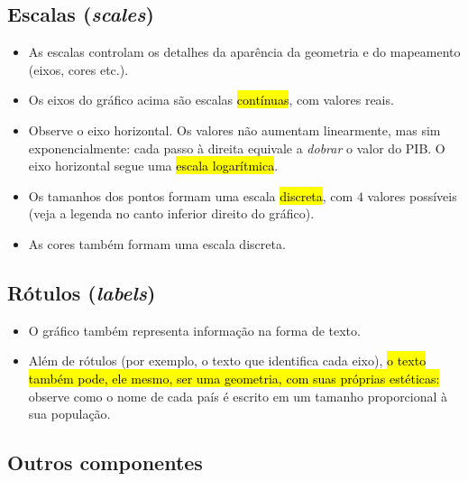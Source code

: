 \documentclass[
  11pt]{report}
\begin{document}
\hypertarget{escalas-scales}{%
\subsection{\texorpdfstring{Escalas (\emph{scales})}{Escalas (scales)}}\label{escalas-scales}}

\begin{itemize}
\item
  As escalas controlam os detalhes da aparência da geometria e do mapeamento (eixos, cores etc.).
\item
  Os eixos do gráfico acima são escalas {\hl{contínuas}}, com valores reais.
\item
  Observe o eixo horizontal. Os valores não aumentam linearmente, mas sim exponencialmente: cada passo à direita equivale a \emph{dobrar} o valor do PIB. O eixo horizontal segue uma {\hl{escala logarítmica}}.
\item
  Os tamanhos dos pontos formam uma escala {\hl{discreta}}, com $4$ valores possíveis (veja a legenda no canto inferior direito do gráfico).
\item
  As cores também formam uma escala discreta.
\end{itemize}

\hypertarget{ruxf3tulos-labels}{%
\subsection{\texorpdfstring{Rótulos (\emph{labels})}{Rótulos (labels)}}\label{ruxf3tulos-labels}}

\begin{itemize}
\item
  O gráfico também representa informação na forma de texto.
\item
  Além de rótulos (por exemplo, o texto que identifica cada eixo), {\hl{o texto também pode, ele mesmo, ser uma geometria, com suas próprias estéticas:}} observe como o nome de cada país é escrito em um tamanho proporcional à sua população.
\end{itemize}

\hypertarget{outros-componentes}{%
\subsection{Outros componentes}\label{outros-componentes}}
\end{document}
